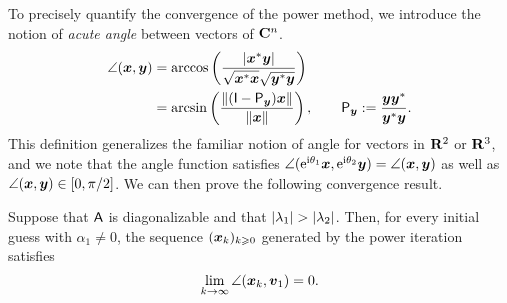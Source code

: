 To precisely quantify the convergence of the power method,
we introduce the notion of \emph{acute angle} between vectors of $\mathbf C^n$.
\begin{align*}
    \angle(\mathbf{\boldsymbol{x}}, \mathbf{\boldsymbol{y}})
    &= \arccos\left( \frac{\lvert\mathbf{\boldsymbol{x}}^* \mathbf{\boldsymbol{y}}\rvert}{\sqrt{\mathbf{\boldsymbol{x}}^* \mathbf{\boldsymbol{x}}} \sqrt{\mathbf{\boldsymbol{y}}^* \mathbf{\boldsymbol{y}}}}\right) \\
    &= \arcsin\left( \frac{\lVert(\mathsf I - \mathsf P_{\mathbf{\boldsymbol{y}}}) \mathbf{\boldsymbol{x}}\rVert} {\lVert\mathbf{\boldsymbol{x}}\rVert} \right),
    \qquad \mathsf P_{\mathbf{\boldsymbol{y}}} := \frac{\mathbf{\boldsymbol{y}} \mathbf{\boldsymbol{y}}^*}{\mathbf{\boldsymbol{y}}^* \mathbf{\boldsymbol{y}}}.
\end{align*}
This definition generalizes the familiar notion of angle for vectors in $\mathbf R^2$ or $\mathbf R^3$,
and we note that the angle function satisfies $\angle(\mathrm e^{\mathrm i \theta_1} \mathbf{\boldsymbol{x}}, \mathrm e^{\mathrm i \theta_2} \mathbf{\boldsymbol{y}}) = \angle(\mathbf{\boldsymbol{x}}, \mathbf{\boldsymbol{y}})$ as well as $\angle(\mathbf{\boldsymbol{x}}, \mathbf{\boldsymbol{y}}) \in [0, \pi/2]$.
We can then prove the following convergence result.
\begin{proposition}
    \label{proposition:convergence_of_the_power_iteration}
    Suppose that $\mathsf A$ is diagonalizable and that $\lvert\lambda_1\rvert > \lvert\lambda_2\rvert$.
    Then, for every initial guess with $\alpha_1 \neq 0$,
    the sequence $(\mathbf{\boldsymbol{x}}_k)_{k \geqslant 0}$ generated by the power iteration satisfies
    \[
        \lim_{k \to \infty} \angle(\mathbf{\boldsymbol{x}}_k, \mathbf{\boldsymbol{v}}_1) = 0.
    \]
\end{proposition}
